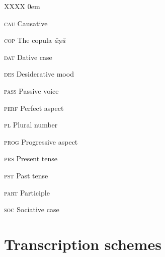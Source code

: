 \documentclass[a4paper]{article}
\begin{document}
\begin{multicols}{2}
\begin{labeling}{XXXX}
\itemsep0em
\item [\textsc{cau}] Causative
\item [\textsc{cop}] The copula \textit{āṇŭ}
\item [\textsc{dat}] Dative case
\item [\textsc{des}] Desiderative mood
\item [\textsc{pass}] Passive voice
\item [\textsc{perf}] Perfect aspect
\item [\textsc{pl}] Plural number
\item [\textsc{prog}] Progressive aspect
\item [\textsc{prs}] Present tense
\item [\textsc{pst}] Past tense
\item [\textsc{part}] Participle
\item [\textsc{soc}] Sociative case
\end{labeling}
\end{multicols}

\section{Transcription schemes}
\end{document}
